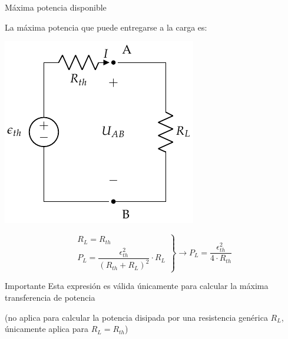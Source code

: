 \documentclass[aspectratio=169, xcolor={usenames,svgnames,dvipsnames}]{beamer}
\begin{document}
\begin{frame}{Máxima potencia disponible}

\vspace{3mm}
La \alert{máxima potencia} que puede entregarse a la carga es:

    \vspace{3mm}
    \begin{minipage}[c]{0.4\linewidth}
        \includegraphics[height=0.62\textheight]{../figs/EquivalenteThevenin0_R.pdf}
    \end{minipage}
    \hfill
    \begin{minipage}[c]{0.58\linewidth}
        \begin{equation*}
          \left.
            \begin{matrix}
              R_L = R_{th}\\[5pt]
              P_L = \dfrac{\epsilon^2_{th}}{(R_{th} + R_L)^2} \cdot R_L
            \end{matrix} \right\}\rightarrow
          \boxed{P_L = \frac{\epsilon^2_{th}}{4 \cdot R_{th}}}
        \end{equation*}
    
        \begin{block}{Importante}
            Esta expresión es \alert{válida únicamente} para calcular la \alert{máxima transferencia} de potencia
        \end{block}
        \centering \small{(no aplica para calcular la potencia disipada por una resistencia genérica $R_L$, únicamente aplica para $R_L = R_{th}$)}
    \end{minipage}
\end{frame}

\end{document}
